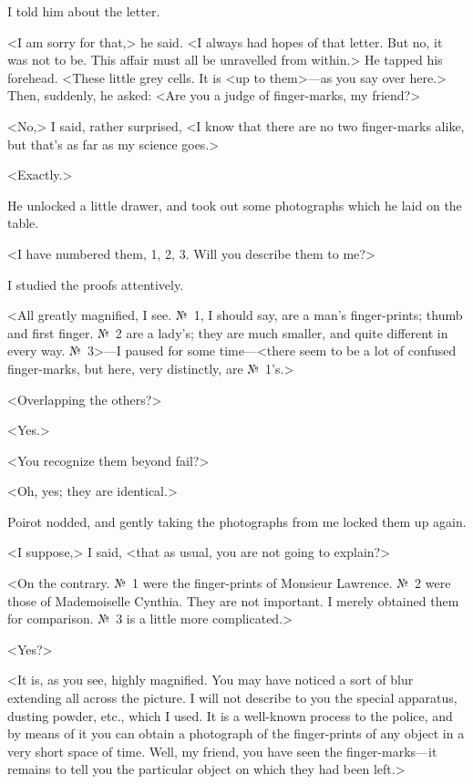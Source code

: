  I told him about the letter. 

 <I am sorry for that,> he said. <I always had hopes of that letter. But no, it was not to be. This affair must all be unravelled from within.> He tapped his forehead. <These little grey cells. It is <up to them>—as you say over here.> Then, suddenly, he asked: <Are you a judge of finger-marks, my friend?> 

 <No,> I said, rather surprised, <I know that there are no two finger-marks alike, but that's as far as my science goes.> 

 <Exactly.> 

 He unlocked a little drawer, and took out some photographs which he laid on the table. 

 <I have numbered them, 1, 2, 3. Will you describe them to me?> 

 I studied the proofs attentively. 

 <All greatly magnified, I see. №~1, I should say, are a man's finger-prints; thumb and first finger. №~2 are a lady's; they are much smaller, and quite different in every way. №~3>—I paused for some time—<there seem to be a lot of confused finger-marks, but here, very distinctly, are №~1's.> 

 <Overlapping the others?> 

 <Yes.> 

 <You recognize them beyond fail?> 

 <Oh, yes; they are identical.> 

 Poirot nodded, and gently taking the photographs from me locked them up again. 

 <I suppose,> I said, <that as usual, you are not going to explain?> 

 <On the contrary. №~1 were the finger-prints of Monsieur Lawrence. №~2 were those of Mademoiselle Cynthia. They are not important. I merely obtained them for comparison. №~3 is a little more complicated.> 

 <Yes?> 

 <It is, as you see, highly magnified. You may have noticed a sort of blur extending all across the picture. I will not describe to you the special apparatus, dusting powder, etc., which I used. It is a well-known process to the police, and by means of it you can obtain a photograph of the finger-prints of any object in a very short space of time. Well, my friend, you have seen the finger-marks—it remains to tell you the particular object on which they had been left.> 

